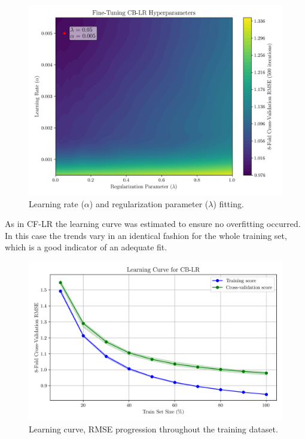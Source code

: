 \documentclass[conference]{IEEEtran}
\begin{document}
\begin{figure}[H]
    \centering
    \includegraphics[width=1\linewidth]{assets/model02_hyperparemeterstunning.png}
    \caption{Learning rate ($\alpha$) and regularization parameter ($\lambda$) fitting.}
    \label{fig:model02_hyperparemeterstunning}
\end{figure}


As in CF-LR the learning curve was estimated to ensure no overfitting occurred. In this case the trends vary in an identical fashion for the whole training set, which is a good indicator of an adequate fit. 

\begin{figure}[H]
    \centering
    \includegraphics[width=1\linewidth]{assets/model02_learning_curve.png}
    \caption{Learning curve, RMSE progression throughout the training dataset.}
    \label{fig:model02_learning_curve}
\end{figure}
\end{document}
